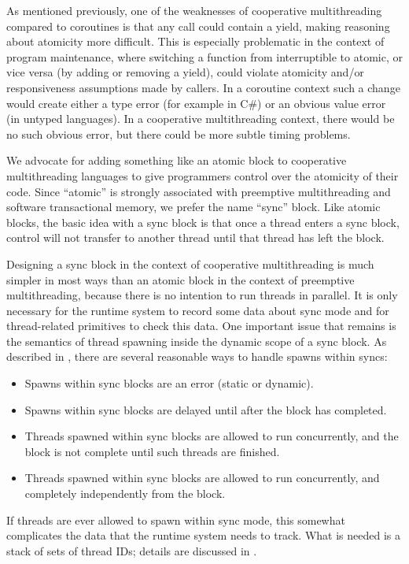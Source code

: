 \documentclass[a4paper,UKenglish,cleveref, autoref]{lipics-v2019}
\begin{document}
As mentioned previously, one of the weaknesses of cooperative multithreading compared to coroutines is that any call could contain a yield, making reasoning about atomicity more difficult.
This is especially problematic in the context of program maintenance, where switching a function from interruptible to atomic, or vice versa (by adding or removing a yield), could violate atomicity and{\slash}or responsiveness assumptions made by callers.
In a coroutine context such a change would create either a type error (for example in C\#) or an obvious value error (in untyped languages).
In a cooperative multithreading context, there would be no such obvious error, but there could be more subtle timing problems.

We advocate for adding something like an atomic block to cooperative multithreading languages to give programmers control over the atomicity of their code.
Since ``atomic'' is strongly associated with preemptive multithreading and software transactional memory, we prefer the name ``sync'' block.
Like atomic blocks, the basic idea with a sync block is that once a thread enters a sync block, control will not transfer to another thread until that thread has left the block.

Designing a sync block in the context of cooperative multithreading is much simpler in most ways than an atomic block in the context of preemptive multithreading, because there is no intention to run threads in parallel.
It is only necessary for the runtime system to record some data about sync mode and for thread-related primitives to check this data.
One important issue that remains is the semantics of thread spawning inside the dynamic scope of a sync block.
As described in \cite{Moore2008}, there are several reasonable ways to handle spawns within syncs:
\begin{itemize}
\item Spawns within sync blocks are an error (static or dynamic).
\item Spawns within sync blocks are delayed until after the block has completed.
\item Threads spawned within sync blocks are allowed to run concurrently, and the block is not complete until such threads are finished.
\item Threads spawned within sync blocks are allowed to run concurrently, and completely independently from the block.
\end{itemize}

If threads are ever allowed to spawn within sync mode, this somewhat complicates the data that the runtime system needs to track.
What is needed is a stack of sets of thread IDs; details are discussed in \cite{Moore2008}.
\end{document}
